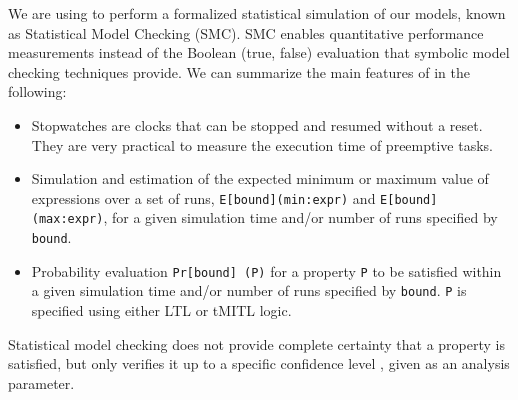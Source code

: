 We are using \uppaalsmc \cite{SMC} to perform a formalized statistical simulation of our models, known as Statistical Model Checking (SMC). SMC enables quantitative performance measurements instead of the Boolean (true, false) evaluation that symbolic model checking techniques provide.    
We can summarize the main features of \uppaalsmc in the following:
\begin{itemize}
\item Stopwatches \cite{DBLP:conf/concur/CassezL00} are clocks that can be stopped and resumed without a reset. They are very practical to measure the execution time of preemptive tasks.
\item Simulation and estimation of the expected minimum or maximum value of expressions over a set of runs, \texttt{E[bound](min:expr)} and \texttt{E[bound](max:expr)}, for a given simulation time and/or number of runs specified by \texttt{bound}. 
\item Probability evaluation \texttt{Pr[bound] (P)} for a property \texttt{P} to be satisfied within a given simulation time and/or number of runs specified by \texttt{bound}. \texttt{P} is specified using either LTL or tMITL logic. 
\end{itemize}

Statistical model checking does not provide complete certainty that a property is satisfied, but only verifies it up to a specific confidence level \cite{DBLP:conf/formats/DavidLLMPVW11}, given as an analysis parameter.